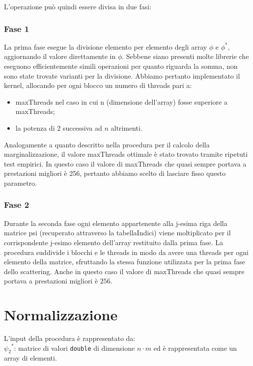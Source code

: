 \documentclass[a4paper]{article}   %
\begin{document}
L’operazione può quindi essere divisa in due fasi: 

\subsubsection{Fase 1}
La prima fase esegue la divisione elemento per elemento degli array $\phi$ e $\phi^{*}$, aggiornando il valore direttamente in $\phi$.
Sebbene siano presenti molte librerie che eseguono efficientemente simili operazioni per quanto riguarda la somma, non sono state trovate varianti per la divisione. 
Abbiamo pertanto implementato il kernel, allocando per ogni blocco un numero di threads pari a:
\begin{itemize}
\item maxThreads nel caso in cui n (dimensione dell’array) fosse superiore a maxThreads;
\item la potenza di $2$ successiva ad $n$ altrimenti. 
\end{itemize}
Analogamente a quanto descritto nella procedura per il calcolo della marginalizzazione, il valore maxThreads ottimale è stato trovato tramite ripetuti test empirici. In questo caso il valore di maxThreads che quasi sempre portava a prestazioni migliori è 256, pertanto abbiamo scelto di lasciare fisso questo parametro.

\subsubsection{Fase 2}
Durante la seconda fase ogni elemento appartenente alla j-esima riga della matrice psi (recuperato attraverso la tabellaIndici) viene moltiplicato per il corrispondente j-esimo elemento dell'array restituito dalla prima fase. 
La procedura suddivide i blocchi e le threads in modo da avere una threads per ogni elemento della matrice, sfruttando la stessa funzione utilizzata per la prima fase dello scattering.
Anche in questo caso il valore di maxThreads che quasi sempre portava a prestazioni migliori è $256$.

\section{Normalizzazione}

L'input della procedura è rappresentato da:\\
${\psi_2}^{*}$: matrice di valori {\tt double} di dimensione $n \cdot m$ ed è rappresentata come un array di elementi.
\end{document}
